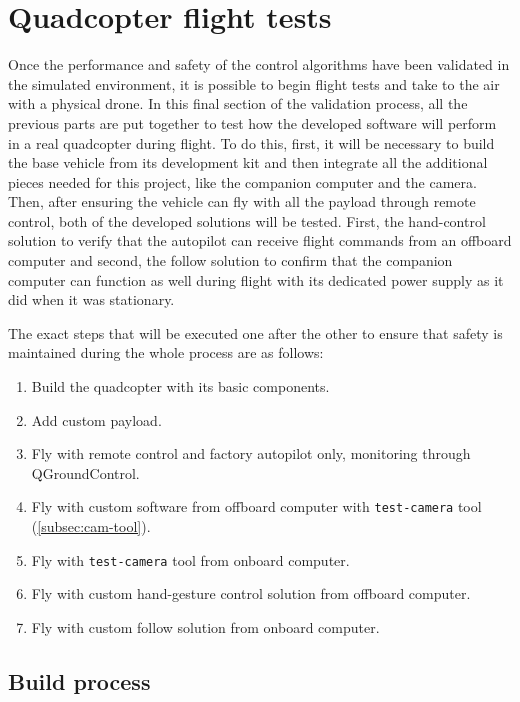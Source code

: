 \section{Quadcopter flight tests}

Once the performance and safety of the control algorithms have been validated in the simulated environment, it is possible to begin flight tests and take to the air with a physical drone.
In this final section of the validation process, all the previous parts are put together to test how the developed software will perform in a real quadcopter during flight.
To do this, first, it will be necessary to build the base vehicle from its development kit and then integrate all the additional pieces needed for this project, like the companion computer and the camera.
Then, after ensuring the vehicle can fly with all the payload through remote control, both of the developed solutions will be tested.
First, the hand-control solution to verify that the autopilot can receive flight commands from an offboard computer and second, the follow solution to confirm that the companion computer can function as well during flight with its dedicated power supply as it did when it was stationary.

The exact steps that will be executed one after the other to ensure that safety is maintained during the whole process are as follows:

\begin{enumerate}
    \item Build the quadcopter with its basic components.
    \item Add custom payload.
    \item Fly with remote control and factory autopilot only, monitoring through QGroundControl.
    \item Fly with custom software from offboard computer with \texttt{test-camera} tool (\ref{subsec:cam-tool}).
    \item Fly with \texttt{test-camera} tool from onboard computer.
    \item Fly with custom hand-gesture control solution from offboard computer.
    \item Fly with custom follow solution from onboard computer.
\end{enumerate}

\subsection{Build process}
\label{sec:test-7-builddrone}

